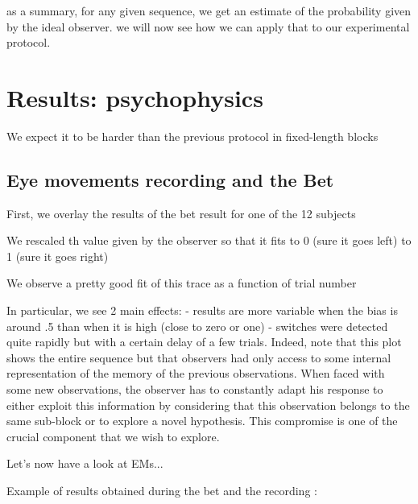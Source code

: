 \documentclass[profile,final,english, draft]{article}%
\begin{document}
as a summary, for any given sequence, we get an estimate of the probability given by the ideal observer. we will now see how we can apply that to our experimental protocol.


\section{Results: psychophysics}

We expect it to be harder than the previous protocol  in fixed-length blocks

\subsection{Eye movements recording and the Bet}

First, we overlay the results of the bet result for one of the 12 subjects

We rescaled th value given by the observer so that it fits to 0 (sure it goes left) to 1 (sure it goes right)

We observe a pretty good fit of this trace as a function of trial number


In particular, we see 2 main effects:
- results are more variable when the bias is around .5 than when it is high (close to zero or one)
- switches were detected quite rapidly but with a certain delay of a few trials. Indeed, note that this plot shows the entire sequence but that observers had only access to some internal representation of the memory of the previous observations. When faced with some new observations, the observer has to constantly adapt his response to either exploit this information by considering that this observation belongs to the same sub-block or to explore a novel hypothesis. This compromise is one of the crucial component that we wish to explore.

Let's now have a look at EMs...

Example of results obtained during the bet and the recording :


\end{document}
